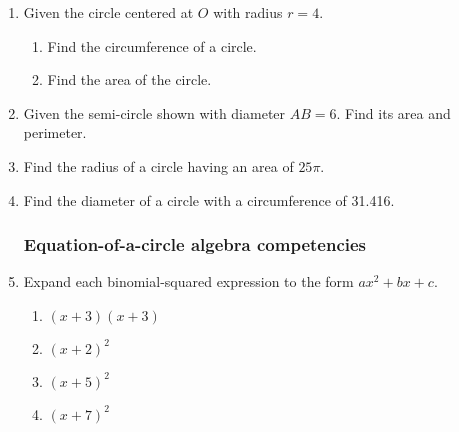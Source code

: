 \documentclass[12pt, twoside]{article}
\begin{document}
\begin{enumerate}
  \item Given the circle centered at $O$ with radius $r=4$.
  \begin{multicols}{2}
    \begin{enumerate}
      \item Find the circumference of a circle. %
      \item Find the area of the circle.\vspace{3cm}
    \end{enumerate}
  \end{multicols}

  \item Given the semi-circle shown with diameter $AB=6$. Find its area and perimeter.
    \begin{flushright}
  \end{flushright} \vspace{1cm}

  \item Find the radius of a circle having an area of $25 \pi$. \vspace{2cm}
  \item Find the diameter of a circle with a circumference of 31.416.

\newpage
\subsubsection*{Equation-of-a-circle algebra competencies} 
  
  \item Expand each binomial-squared expression to the form $ax^2+bx+c$.
  \begin{multicols}{2}
  \begin{enumerate}[itemsep=3cm]
    \item $(x+3)(x+3)$
    \item $(x+2)^2$ 
    \item $(x+5)^2$ 
    \item $(x+7)^2$ 
  \end{enumerate}
  \end{multicols}\vspace{3cm}
  

\end{enumerate}
\end{document}
